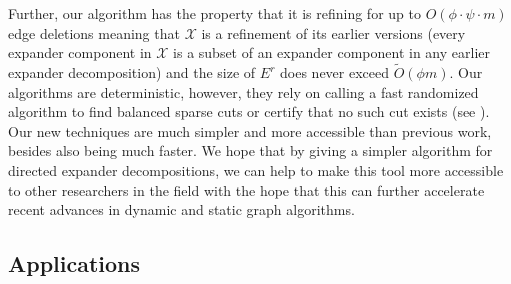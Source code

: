 \documentclass[11pt]{article}
\begin{document}
Further, our algorithm has the property that it is refining for up to $O(\phi \cdot \psi \cdot m)$ edge deletions meaning that $\mathcal{X}$ is a refinement of its earlier versions (every expander component in $\mathcal{X}$ is a subset of an expander component in any earlier expander decomposition) and the size of $E^r$ does never exceed $\tilde{O}(\phi m)$. Our algorithms are deterministic, however, they rely on calling a fast randomized algorithm to find balanced sparse cuts or certify that no such cut exists (see \cite{khandekar2009graph, louis2010cut}). Our new techniques are much simpler and more accessible than previous work, besides also being much faster. We hope that by giving a simpler algorithm for directed expander decompositions, we can help to make this tool more accessible to other researchers in the field with the hope that this can further accelerate recent advances in dynamic and static graph algorithms.

\subsection{Applications}
\label{subsec:appl}
\end{document}
